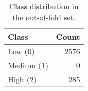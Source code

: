 \begin{table}
\caption{Class distribution in the out-of-fold set.}
\label{tab:class-dist}
\begin{tabular}{lr}
\toprule
Class & Count \\
\midrule
Low (0) & 2576 \\
Medium (1) & 0 \\
High (2) & 285 \\
\bottomrule
\end{tabular}
\end{table}
